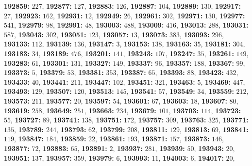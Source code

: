 \textsf{\bfseries 192859:} $227$, \textsf{\bfseries 192877:} $127$, \textsf{\bfseries 192883:} $126$, \textsf{\bfseries 192887:} $104$, \textsf{\bfseries 192889:} $130$, \textsf{\bfseries 192917:} $27$, \textsf{\bfseries 192923:} $162$, \textsf{\bfseries 192931:} $12$, \textsf{\bfseries 192949:} $26$, \textsf{\bfseries 192961:} $302$, \textsf{\bfseries 192971:} $130$, \textsf{\bfseries 192977:} $541$, \textsf{\bfseries 192979:} $98$, \textsf{\bfseries 192991:} $48$, \textsf{\bfseries 193003:} $488$, \textsf{\bfseries 193009:} $416$, \textsf{\bfseries 193013:} $288$, \textsf{\bfseries 193031:} $587$, \textsf{\bfseries 193043:} $302$, \textsf{\bfseries 193051:} $123$, \textsf{\bfseries 193057:} $13$, \textsf{\bfseries 193073:} $383$, \textsf{\bfseries 193093:} $296$, \textsf{\bfseries 193133:} $112$, \textsf{\bfseries 193139:} $136$, \textsf{\bfseries 193147:} $3$, \textsf{\bfseries 193153:} $138$, \textsf{\bfseries 193163:} $35$, \textsf{\bfseries 193181:} $304$, \textsf{\bfseries 193183:} $34$, \textsf{\bfseries 193189:} $476$, \textsf{\bfseries 193201:} $141$, \textsf{\bfseries 193243:} $107$, \textsf{\bfseries 193247:} $35$, \textsf{\bfseries 193261:} $149$, \textsf{\bfseries 193283:} $61$, \textsf{\bfseries 193301:} $131$, \textsf{\bfseries 193327:} $149$, \textsf{\bfseries 193337:} $96$, \textsf{\bfseries 193357:} $188$, \textsf{\bfseries 193367:} $99$, \textsf{\bfseries 193373:} $5$, \textsf{\bfseries 193379:} $53$, \textsf{\bfseries 193381:} $353$, \textsf{\bfseries 193387:} $65$, \textsf{\bfseries 193393:} $88$, \textsf{\bfseries 193423:} $432$, \textsf{\bfseries 193433:} $40$, \textsf{\bfseries 193441:} $211$, \textsf{\bfseries 193447:} $102$, \textsf{\bfseries 193451:} $321$, \textsf{\bfseries 193463:} $5$, \textsf{\bfseries 193469:} $447$, \textsf{\bfseries 193493:} $129$, \textsf{\bfseries 193507:} $120$, \textsf{\bfseries 193513:} $145$, \textsf{\bfseries 193541:} $57$, \textsf{\bfseries 193549:} $34$, \textsf{\bfseries 193559:} $212$, \textsf{\bfseries 193573:} $211$, \textsf{\bfseries 193577:} $20$, \textsf{\bfseries 193597:} $54$, \textsf{\bfseries 193601:} $67$, \textsf{\bfseries 193603:} $18$, \textsf{\bfseries 193607:} $80$, \textsf{\bfseries 193619:} $258$, \textsf{\bfseries 193649:} $251$, \textsf{\bfseries 193663:} $234$, \textsf{\bfseries 193679:} $101$, \textsf{\bfseries 193703:} $114$, \textsf{\bfseries 193723:} $55$, \textsf{\bfseries 193727:} $89$, \textsf{\bfseries 193741:} $138$, \textsf{\bfseries 193751:} $172$, \textsf{\bfseries 193757:} $309$, \textsf{\bfseries 193763:} $325$, \textsf{\bfseries 193771:} $135$, \textsf{\bfseries 193789:} $244$, \textsf{\bfseries 193793:} $62$, \textsf{\bfseries 193799:} $208$, \textsf{\bfseries 193811:} $129$, \textsf{\bfseries 193813:} $69$, \textsf{\bfseries 193841:} $119$, \textsf{\bfseries 193847:} $184$, \textsf{\bfseries 193859:} $22$, \textsf{\bfseries 193861:} $193$, \textsf{\bfseries 193871:} $157$, \textsf{\bfseries 193873:} $146$, \textsf{\bfseries 193877:} $72$, \textsf{\bfseries 193883:} $65$, \textsf{\bfseries 193891:} $2$, \textsf{\bfseries 193937:} $281$, \textsf{\bfseries 193939:} $50$, \textsf{\bfseries 193943:} $20$, \textsf{\bfseries 193951:} $137$, \textsf{\bfseries 193957:} $359$, \textsf{\bfseries 193979:} $6$, \textsf{\bfseries 193993:} $11$, \textsf{\bfseries 194003:} $6$, \textsf{\bfseries 194017:} $20$, 
